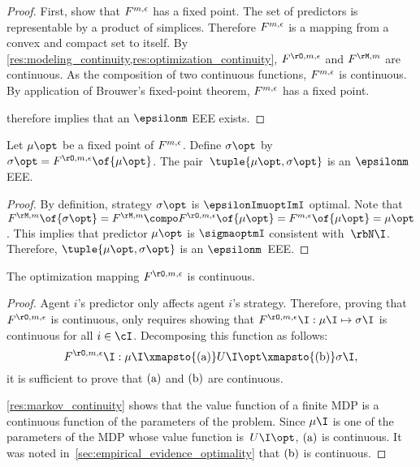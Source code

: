 \begin{proof}
First, show that \(F^{m, \epsilon}\) has a fixed point.
The set of predictors is representable by a product of simplices.
Therefore \(F^{m, \epsilon}\) is a mapping from a convex and compact set to itself.
By \cref{res:modeling_continuity,res:optimization_continuity}, \(\FO\) and \(\FM\) are continuous.
As the composition of two continuous functions, \(F^{m, \epsilon}\) is continuous.
By application of Brouwer's fixed-point theorem, \(F^{m, \epsilon}\) has a fixed point.

 therefore implies that an \(\epsilonm\) EEE exists.
\end{proof}

\begin{proposition}
\label{res:fixed_point_EEE}
Let \(\mu\opt\) be a fixed point of \(F^{m, \epsilon}\).
Define \(\sigma\opt\) by \(\sigma\opt = \FO \of{\mu\opt}\).
The pair~\(\tuple{\mu\opt, \sigma\opt}\) is an \(\epsilonm\) EEE.
\end{proposition}

\begin{proof}
By definition, strategy \(\sigma\opt\) is \(\epsilonImuoptImI\) optimal.
Note that \(\FM \of{\sigma\opt} = \FM \compo \FO \of{\mu\opt} = \FF \of{\mu\opt} = \mu\opt\).
This implies that predictor \(\mu\opt\) is \(\sigmaoptmI\) consistent with~\(\rbN\I\).
Therefore, \(\tuple{\mu\opt, \sigma\opt}\) is an \(\epsilonm\)~EEE.
\end{proof}

\begin{proposition}
\label{res:optimization_continuity}
The optimization mapping \(\FO\) is continuous.
\end{proposition}

\begin{proof}
Agent \(i\)'s predictor only affects agent \(i\)'s strategy.
Therefore, proving that \(\FO\) is continuous, only requires showing that \(\FO\I: \mu\I \mapsto \sigma\I\) is continuous for all \(i \in \cI\).
Decomposing this function as follows:
\[
\FO\I: \mu\I \xmapsto{\subfunc{a}} U\I\opt \xmapsto{\subfunc{b}} \sigma\I,
\]
it is sufficient to prove that \(\mathrm{(a)}\) and \(\mathrm{(b)}\) are continuous.

\cref{res:markov_continuity} shows that the value function of a finite MDP is a continuous function of the parameters of the problem.
Since \(\mu\I\) is one of the parameters of the MDP whose value function is~\(U\I\opt\), \(\mathrm{(a)}\) is continuous.
It was noted in~\cref{sec:empirical_evidence_optimality} that \(\mathrm{(b)}\) is continuous.
\end{proof}

